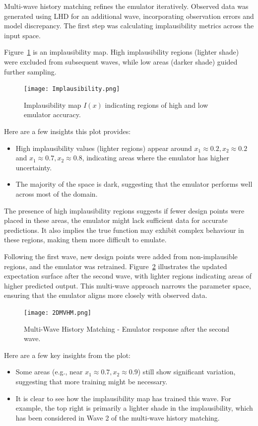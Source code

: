 Multi-wave history matching refines the emulator iteratively. Observed data was generated using LHD for an additional wave, incorporating observation errors and model discrepancy. The first step was calculating implausibility metrics across the input space.

Figure~\ref{fig:implausibility} is an implausibility map. High implausibility regions (lighter shade) were excluded from subsequent waves, while low areas (darker shade) guided further sampling.

\begin{figure}[H]
    \centering
    \texttt{[image: Implausibility.png]}
    \caption{Implausibility map $I(x)$ indicating regions of high and low emulator accuracy.}
    \label{fig:implausibility}
\end{figure}

\noindent Here are a few insights this plot provides:
\begin{itemize}
    \item High implausibility values (lighter regions) appear around \( x_1 \approx 0.2, x_2 \approx 0.2 \) and \( x_1 \approx 0.7, x_2 \approx 0.8 \), indicating areas where the emulator has higher uncertainty.
    \item The majority of the space is dark, suggesting that the emulator performs well across most of the domain.
\end{itemize}

\noindent The presence of high implausibility regions suggests if fewer design points were placed in these areas, the emulator might lack sufficient data for accurate predictions. It also implies the true function may exhibit complex behaviour in these regions, making them more difficult to emulate.

Following the first wave, new design points were added from non-implausible regions, and the emulator was retrained. Figure~\ref{fig:2DMVHM} illustrates the updated expectation surface after the second wave, with lighter regions indicating areas of higher predicted output. This multi-wave approach narrows the parameter space, ensuring that the emulator aligns more closely with observed data.

\begin{figure}[H]
    \centering
    \texttt{[image: 2DMVHM.png]}
    \caption{Multi-Wave History Matching - Emulator response after the second wave.}
    \label{fig:2DMVHM}
\end{figure}
\noindent Here are a few key insights from the plot:
\begin{itemize}
    \item Some areas (e.g., near \(x_1 \approx 0.7, x_2 \approx 0.9\)) still show significant variation, suggesting that more training might be necessary.
    \item It is clear to see how the implausibility map has trained this wave. For example, the top right is primarily a lighter shade in the implausibility, which has been considered in Wave 2 of the multi-wave history matching.
\end{itemize}

